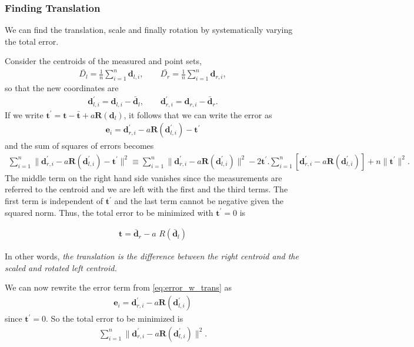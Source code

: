 \subsubsection{Finding Translation}
%
We can find the translation, scale and finally rotation by systematically varying the total error.

Consider the centroids of the measured and point sets,
%
\begin{align}
	\bar{D_l} = \frac{1}{n} \sum_{i=1}^{n} \bm{d}_{l,i}, \qquad 	\bar{D_r} = \frac{1}{n} \sum_{i=1}^{n} \bm{d}_{r,i},
\end{align}
%
so that the new coordinates are 
%
\begin{align}
\bm{d}^\prime_{l,i} = \bm{d}_{l,i} - \bar{\bm{d}}_l, \qquad 	\bm{d}^\prime_{r,i} = \bm{d}_{r,i} - \bar{\bm{d}}_r.
\end{align}
%
If we write $\bm{t}^\prime = \bm{t} - \bar{\bm{t}} + a \bm{R}(\bm{d}_l)$, it follows that we can write the error as 
%
\begin{align}
		\bm{e}_i = \bm{d}^\prime_{r,i} - a \bm{R}(\bm{d}^\prime_{l,i}) - \bm{t}^\prime
		\label{eq:error_w_trans}
\end{align}
%
and the sum of squares of errors becomes
%
\begin{align}
	\sum_{i=1}^{n} \|\bm{d}^\prime_{r,i} - a \bm{R}(\bm{d}^\prime_{l,i}) - \bm{t}^\prime\|^2 \equiv 	\sum_{i=1}^{n} \|\bm{d}^\prime_{r,i} - a \bm{R}(\bm{d}^\prime_{l,i})\|^2 - 2 \bm{t}^\prime . \sum_{i=1}^{n}\left[\bm{d}^\prime_{r,i} - a \bm{R}(\bm{d}^\prime_{l,i})\right] + n \|\bm{t}^\prime \|^2.
\end{align}
% 
The middle term on the right hand side vanishes since the measurements are referred to the centroid and we are left with the first and the third terms. The first term is independent of $\bm{t}^\prime$ and the last term cannot be negative given the squared norm. Thus,  the  total error to be minimized with $\bm{t}^\prime = 0$ is 
%
\begin{tcolorbox}[title=Optimal Translation]
	\begin{align}
	\bm{t} = \bar{\bm{d}}_r - a \,\, R(\bar{\bm{d}}_l)
	\end{align}
\end{tcolorbox}
%
In other words, \textit{the translation is the difference between the right centroid and the scaled and rotated left centroid. }

We can now rewrite the error term from \eqref{eq:error_w_trans} as 
%
\begin{align}
\bm{e}_i = \bm{d}^\prime_{r,i} - a \bm{R}(\bm{d}^\prime_{l,i}) 
\label{eq:error_no_trans}
\end{align}
%
since $\bm{t}^\prime=0$. So the total error to be minimized is 
%
\begin{align}
	\sum_{i=1}^{n} \|\bm{d}^\prime_{r,i} - a \bm{R}(\bm{d}^\prime_{l,i})\|^2.
	\label{eq:resulting_error}
\end{align}


